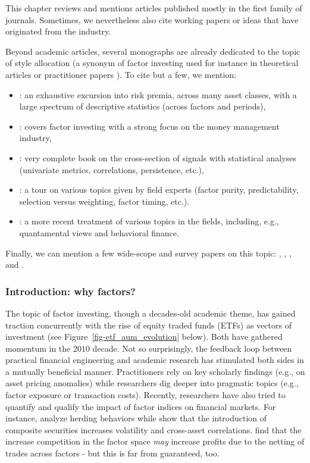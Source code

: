 This chapter reviews and mentions articles published mostly in the first family of journals. Sometimes, we nevertheless also cite working papers or ideas that have originated from the industry.

Beyond academic articles, several monographs are already dedicated to the topic of style allocation (a synonym of factor investing used for instance in theoretical articles \cite{barberis2003style} or practitioner papers \cite{asness2015investing}). To cite but a few, we mention:

\begin{itemize}
\item \cite{ilmanen2011expected}: an exhaustive excursion into risk premia, across many asset classes, with a large spectrum of descriptive statistics (across factors and periods),
\item \cite{ang2014asset}: covers factor investing with a strong focus on the money management industry,
\item \cite{bali2016empirical}: very complete book on the cross-section of signals with statistical analyses (univariate metrics, correlations, persistence, etc.),
\item \cite{jurczenko2017factor}: a tour on various topics given by field experts (factor purity, predictability, selection versus weighting, factor timing, etc.).
\item \cite{zhang2024navigating}: a more recent treatment of various topics in the fields, including, e.g., quantamental views and behavioral finance.
\end{itemize}

Finally, we can mention a few wide-scope and survey papers on this topic: \cite{goyal2012empirical}, \cite{cazalet2014facts}, \cite{baz2015dissecting}, \cite{giglio2022factor} and \cite{shi2025econometrics}.

\subsubsection{Introduction: why factors?}

The topic of factor investing, though a decades-old academic theme, has gained traction concurrently with the rise of equity traded funds (ETFs) as vectors of investment (see Figure~\ref{fig-etf_aum_evolution} below). Both have gathered momentum in the 2010 decade. Not so surprisingly, the feedback loop between practical financial engineering and academic research has stimulated both sides in a mutually beneficial manner. Practitioners rely on key scholarly findings (e.g., on asset pricing anomalies) while researchers dig deeper into pragmatic topics (e.g., factor exposure or transaction costs). Recently, researchers have also tried to quantify and qualify the impact of factor indices on financial markets. For instance, \cite{krkoska2019herding} analyze herding behaviors while \cite{cong2019rise} show that the introduction of composite securities increases volatility and cross-asset correlations. \cite{demiguel2019crowding} find that the increase competition in the factor space \textit{may} increase profits due to the netting of trades across factors - but this is far from guaranteed, too.

